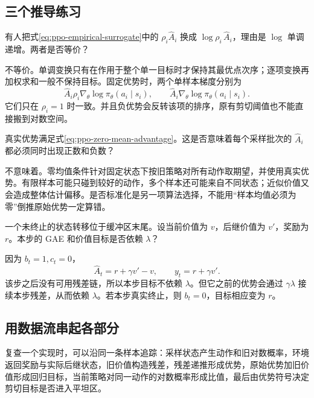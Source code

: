 \documentclass[UTF8]{ctexart}
\begin{document}
\subsection{三个推导练习}

\begin{example}[概率比不能随意换成对数概率比]
有人把式\eqref{eq:ppo-empirical-surrogate}中的
$\rho_i\widehat A_i$ 换成
$\log\rho_i\,\widehat A_i$，理由是 $\log$ 单调递增。两者是否等价？
\end{example}
\begin{solve}
不等价。单调变换只有在作用于整个单一目标时才保持其最优点次序；逐项变换再加权求和一般不保持目标。固定优势时，两个单样本梯度分别为
\[
  \widehat A_i\rho_i\nabla_\theta\log\pi_\theta(a_i\mid s_i),
  \qquad
  \widehat A_i\nabla_\theta\log\pi_\theta(a_i\mid s_i).
\]
它们只在 $\rho_i=1$ 时一致。并且负优势会反转该项的排序，原有剪切阈值也不能直接搬到对数空间。
\end{solve}

\begin{example}[一批全是正优势是否合理]
真实优势满足式\eqref{eq:ppo-zero-mean-advantage}。这是否意味着每个采样批次的 $\widehat A_i$ 都必须同时出现正数和负数？
\end{example}
\begin{solve}
不意味着。零均值条件针对固定状态下按旧策略对所有动作取期望，并使用真实优势。有限样本可能只碰到较好的动作，多个样本还可能来自不同状态；近似价值又会造成整体估计偏移。是否标准化是另一项算法选择，不能用“样本均值必须为零”倒推原始优势一定算错。
\end{solve}

\begin{example}[采样块末尾的价值目标]
一个未终止的状态转移位于缓冲区末尾。设当前价值为 $v$，后继价值为 $v'$，奖励为 $r$。本步的 GAE 和价值目标是否依赖 $\lambda$？
\end{example}
\begin{solve}
因为 $b_t=1,c_t=0$，
\[
  \widehat A_t=r+\gamma v'-v,\qquad
  y_t=r+\gamma v'.
\]
该步之后没有可用残差链，所以本步目标不依赖 $\lambda$。但它之前的优势会通过 $\gamma\lambda$ 接续本步残差，从而依赖 $\lambda$。若本步真实终止，则 $b_t=0$，目标相应变为 $r$。
\end{solve}

\subsection{用数据流串起各部分}

复查一个实现时，可以沿同一条样本追踪：采样状态产生动作和旧对数概率，环境返回奖励与实际后继状态，旧价值构造残差，残差递推形成优势，原始优势加旧价值形成回归目标，当前策略对同一动作的对数概率形成比值，最后由优势符号决定剪切目标是否进入平坦区。
\end{document}
